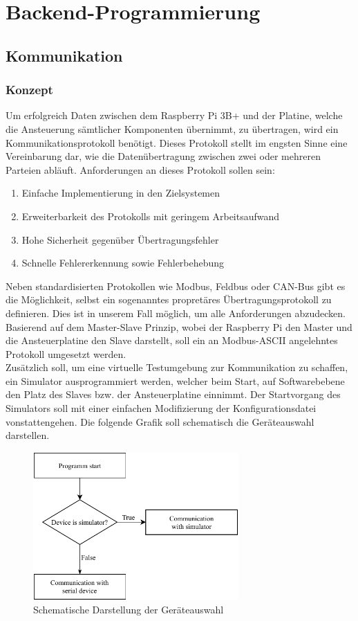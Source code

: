 \section{Backend-Programmierung}\label{sec:backend-programmierung}
\subsection{Kommunikation}\label{subsec:kommunikation}
\subsubsection{Konzept}
Um erfolgreich Daten zwischen dem Raspberry Pi 3B+ und der Platine, welche die Ansteuerung sämtlicher Komponenten übernimmt, zu übertragen, wird ein Kommunikationsprotokoll benötigt.
Dieses Protokoll stellt im engsten Sinne eine Vereinbarung dar, wie die Datenübertragung zwischen zwei oder mehreren Parteien abläuft.
Anforderungen an dieses Protokoll sollen sein:
\begin{enumerate}
    \item Einfache Implementierung in den Zielsystemen
    \item Erweiterbarkeit des Protokolls mit geringem Arbeitsaufwand
    \item Hohe Sicherheit gegenüber Übertragungsfehler
    \item Schnelle Fehlererkennung sowie Fehlerbehebung
\end{enumerate}
Neben standardisierten Protokollen wie Modbus, Feldbus oder CAN-Bus gibt es die Möglichkeit, selbst ein sogenanntes propretäres Übertragungsprotokoll zu definieren.
Dies ist in unserem Fall möglich, um alle Anforderungen abzudecken.
Basierend auf dem Master-Slave Prinzip, wobei der Raspberry Pi den Master und die Ansteuerplatine den Slave darstellt, soll ein an Modbus-ASCII angelehntes Protokoll umgesetzt werden.\\
Zusätzlich soll, um eine virtuelle Testumgebung zur Kommunikation zu schaffen, ein Simulator ausprogrammiert werden, welcher beim Start, auf Softwarebebene den Platz des Slaves bzw. der Ansteuerplatine einnimmt.
Der Startvorgang des Simulators soll mit einer einfachen Modifizierung der Konfigurationsdatei vonstattengehen.
Die folgende Grafik soll schematisch die Geräteauswahl darstellen.
\begin{figure}[H]
    \centering
    \includegraphics[width=0.7\textwidth]{fig/ainf/DeviceSelection}
    \caption{Schematische Darstellung der Geräteauswahl}
    \label{deviceSelection}
\end{figure}
